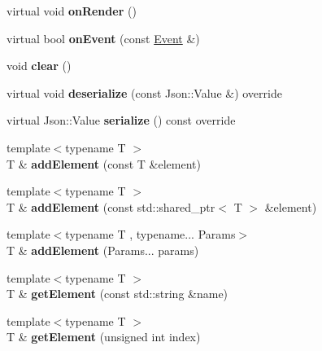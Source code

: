\begin{DoxyCompactItemize}
\item 
\mbox{\label{classbkengine_1_1Scene_afda94c0c7067d5f30b62f2850926876c}} 
virtual void {\bfseries on\+Render} ()
\item 
\mbox{\label{classbkengine_1_1Scene_ab397349c749fb47dae6fe40447c130dd}} 
virtual bool {\bfseries on\+Event} (const \hyperlink{classbkengine_1_1Event}{Event} \&)
\item 
\mbox{\label{classbkengine_1_1Scene_a70e5b1218abb729d70d9f41b107017f9}} 
void {\bfseries clear} ()
\item 
\mbox{\label{classbkengine_1_1Scene_af4a628160b935f47a247c9abbe083598}} 
virtual void {\bfseries deserialize} (const Json\+::\+Value \&) override
\item 
\mbox{\label{classbkengine_1_1Scene_a14a8d5ffd84e2fe7babafaff7a39fd73}} 
virtual Json\+::\+Value {\bfseries serialize} () const override
\item 
\mbox{\label{classbkengine_1_1Scene_a8b72aa22a98f75e49cef5eaa531e2d95}} 
{\footnotesize template$<$typename T $>$ }\\T \& {\bfseries add\+Element} (const T \&element)
\item 
\mbox{\label{classbkengine_1_1Scene_a14a6dc3997d94ecd1410fa2595ab3eb6}} 
{\footnotesize template$<$typename T $>$ }\\T \& {\bfseries add\+Element} (const std\+::shared\+\_\+ptr$<$ T $>$ \&element)
\item 
\mbox{\label{classbkengine_1_1Scene_a5d54191111b9d4b1f6a95730c5affbb1}} 
{\footnotesize template$<$typename T , typename... Params$>$ }\\T \& {\bfseries add\+Element} (Params... params)
\item 
\mbox{\label{classbkengine_1_1Scene_a1695992fd5f3340dc9c78d4bb64ad753}} 
{\footnotesize template$<$typename T $>$ }\\T \& {\bfseries get\+Element} (const std\+::string \&name)
\item 
\mbox{\label{classbkengine_1_1Scene_a2004416cacbd5a6ae3dcd303609d640a}} 
{\footnotesize template$<$typename T $>$ }\\T \& {\bfseries get\+Element} (unsigned int index)
\end{DoxyCompactItemize}
